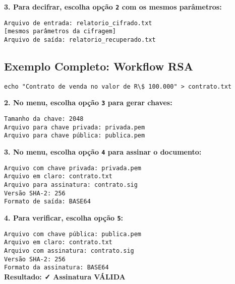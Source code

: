 \documentclass[12pt,a4paper]{article}
\begin{document}
\textbf{3. Para decifrar, escolha opção \texttt{2} com os mesmos parâmetros:}

\begin{tcolorbox}[colback=codebg,colframe=gray!50]
\footnotesize
\texttt{Arquivo de entrada: relatorio\_cifrado.txt}\\
\texttt{[mesmos parâmetros da cifragem]}\\
\texttt{Arquivo de saída: relatorio\_recuperado.txt}
\end{tcolorbox}

\subsection{Exemplo Completo: Workflow RSA}

\begin{lstlisting}[style=bashstyle,caption={1. Preparar documento}]
echo "Contrato de venda no valor de R\$ 100.000" > contrato.txt
\end{lstlisting}

\textbf{2. No menu, escolha opção \texttt{3} para gerar chaves:}

\begin{tcolorbox}[colback=codebg,colframe=gray!50]
\footnotesize
\texttt{Tamanho da chave: 2048}\\
\texttt{Arquivo para chave privada: privada.pem}\\
\texttt{Arquivo para chave pública: publica.pem}
\end{tcolorbox}

\textbf{3. No menu, escolha opção \texttt{4} para assinar o documento:}

\begin{tcolorbox}[colback=codebg,colframe=gray!50]
\footnotesize
\texttt{Arquivo com chave privada: privada.pem}\\
\texttt{Arquivo em claro: contrato.txt}\\
\texttt{Arquivo para assinatura: contrato.sig}\\
\texttt{Versão SHA-2: 256}\\
\texttt{Formato de saída: BASE64}
\end{tcolorbox}

\textbf{4. Para verificar, escolha opção \texttt{5}:}

\begin{tcolorbox}[colback=codebg,colframe=gray!50]
\footnotesize
\texttt{Arquivo com chave pública: publica.pem}\\
\texttt{Arquivo em claro: contrato.txt}\\
\texttt{Arquivo com assinatura: contrato.sig}\\
\texttt{Versão SHA-2: 256}\\
\texttt{Formato da assinatura: BASE64}\\[0.5em]
\textcolor{successgreen}{\textbf{Resultado: ✓ Assinatura VÁLIDA}}
\end{tcolorbox}
\end{document}
